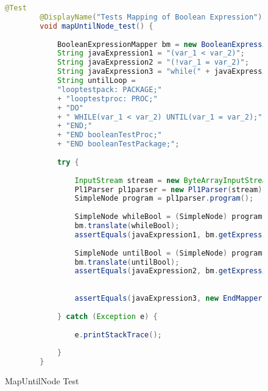 \begin{figure}[H]\caption{MapUntilNode Test} \label{lst:untilwhile_test}
	\begin{lstlisting}[language=Java]
		@Test
		@DisplayName("Tests Mapping of Boolean Expression")
		void mapUntilNode_test() {
			
			BooleanExpressionMapper bm = new BooleanExpressionMapper();
			String javaExpression1 = "(var_1 < var_2)";
			String javaExpression2 = "(!var_1 = var_2)";
			String javaExpression3 = "while(" + javaExpression2 + ")";
			String untilLoop = 
			"looptestpack: PACKAGE;"
			+ "looptestproc: PROC;"
			+ "DO"
			+ "	WHILE(var_1 < var_2) UNTIL(var_1 = var_2);"
			+ "END;"
			+ "END booleanTestProc;"
			+ "END booleanTestPackage;";
			
			try {
				
				InputStream stream = new ByteArrayInputStream(untilLoop.getBytes(StandardCharsets.UTF_8));
				Pl1Parser pl1parser = new Pl1Parser(stream);
				SimpleNode program = pl1parser.program();
				
				SimpleNode whileBool = (SimpleNode) program.jjtGetChild(0).jjtGetChild(0).jjtGetChild(0).jjtGetChild(0);
				bm.translate(whileBool);
				assertEquals(javaExpression1, bm.getExpression());
				
				SimpleNode untilBool = (SimpleNode) program.jjtGetChild(0).jjtGetChild(0).jjtGetChild(0).jjtGetChild(1).jjtGetChild(0);
				bm.translate(untilBool);
				assertEquals(javaExpression2, bm.getExpression());
				
				
				assertEquals(javaExpression3, new EndMapper().getClosingExpression());
				
			} catch (Exception e) {
				
				e.printStackTrace();
				
			}
		}
	\end{lstlisting}
\end{figure}

